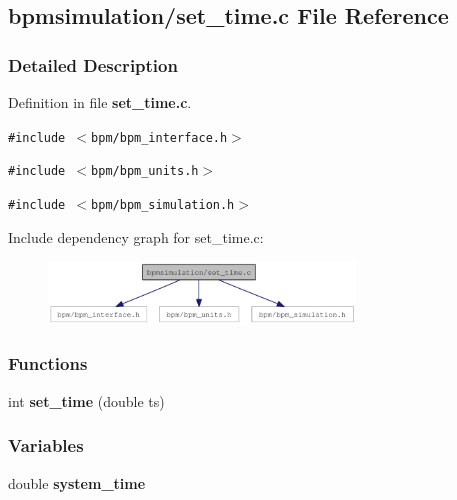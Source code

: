 \subsection{bpmsimulation/set\_\-time.c File Reference}
\label{set__time_8c}


\subsubsection{Detailed Description}


Definition in file {\bf set\_\-time.c}.

{\tt \#include $<$bpm/bpm\_\-interface.h$>$}\par
{\tt \#include $<$bpm/bpm\_\-units.h$>$}\par
{\tt \#include $<$bpm/bpm\_\-simulation.h$>$}\par


Include dependency graph for set\_\-time.c:\nopagebreak
\begin{figure}[H]
\begin{center}
\leavevmode
\includegraphics[width=231pt]{set__time_8c__incl}
\end{center}
\end{figure}
\subsubsection*{Functions}
\begin{CompactItemize}
\item 
int {\bf set\_\-time} (double ts)
\end{CompactItemize}
\subsubsection*{Variables}
\begin{CompactItemize}
\item 
double \textbf{system\_\-time}\label{set__time_8c_53853a025ce512b824e4c9732d525593}

\end{CompactItemize}

